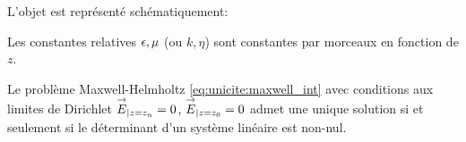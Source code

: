     L'objet est représenté schématiquement:
    \begin{figure}[h!btp]
        \centering
        \begin{tikzpicture}
            
        \end{tikzpicture}
    \end{figure}

    Les constantes relatives \(\eps,\mu\) (ou \(k,\eta\)) sont constantes par morceaux en fonction de \(z\).
    \begin{prop}
      \label{prop:unicite:interieur:postulat:multi-couche}
      Le problème Maxwell-Helmholtz \eqref{eq:unicite:maxwell_int} avec conditions aux limites de Dirichlet \(\vE_{|z=z_n} = 0\), \(\vE_{|z=z_0} = 0\) admet une unique solution si et seulement si le déterminant d'un système linéaire est non-nul.
    \end{prop}

